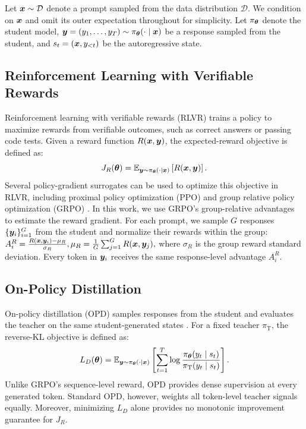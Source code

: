 \documentclass{article} %
\begin{document}
Let \(\bm{x}\sim\mathcal D\) denote a prompt sampled from the data distribution \(\mathcal D\). 
We condition on \(\bm{x}\) and omit its
outer expectation throughout for simplicity. Let \(\pi_{\bm{\theta}}\) denote the student model,
\(\bm{y}=(y_1,\ldots,y_T)\sim\pi_{\bm{\theta}}(\cdot\mid\bm{x})\) be a response sampled
from the student, and \(s_t=(\bm{x},y_{<t})\) be the autoregressive state.

\subsection{Reinforcement Learning with Verifiable Rewards}

Reinforcement learning with verifiable rewards (RLVR) trains a policy to
maximize rewards from verifiable outcomes, such as correct answers or passing
code tests. Given a reward function \(R(\bm{x},\bm{y})\), the expected-reward objective is defined as:
\begin{equation*}
    J_R(\bm{\theta})
    =
    \mathbb E_{\bm{y}\sim\pi_{\bm{\theta}}(\cdot\mid\bm{x})}
    \left[R(\bm{x},\bm{y})\right].
\end{equation*}
Several policy-gradient surrogates can be used to optimize this objective in
RLVR, including proximal policy optimization (PPO)
\citep{schulman2017proximal} and group relative policy optimization (GRPO)
\citep{shao2024deepseekmath}. In this work, we use GRPO's group-relative advantages
to estimate the reward gradient. For each prompt, we sample \(G\) responses
\(\{\bm{y}_i\}_{i=1}^{G}\) from the student and normalize their rewards within
the group:
$A_i^R
    =
    \frac{R(\bm{x},\bm{y}_i)-\mu_R}{\sigma_R},
    \mu_R=\frac{1}{G}\sum_{j=1}^{G}R(\bm{x},\bm{y}_j),$
where \(\sigma_R\) is the group reward standard deviation. Every token in \(\bm{y}_i\) receives
the same response-level advantage \(A_i^R\).

\subsection{On-Policy Distillation}

On-policy distillation (OPD) samples responses from the student and evaluates
the teacher on the same student-generated states
\citep{agarwal2024policy, gu2024minillm}. For a fixed teacher
\(\pi_{\mathrm{T}}\), the reverse-KL objective is defined as:
\begin{equation*}
    L_D(\bm{\theta})
    =
    \mathbb E_{\bm{y}\sim\pi_{\bm{\theta}}(\cdot\mid\bm{x})}
    \left[
        \sum_{t=1}^{T}
        \log
        \frac{\pi_{\bm{\theta}}(y_t\mid s_t)}
             {\pi_{\mathrm{T}}(y_t\mid s_t)}
    \right].
\end{equation*}
Unlike GRPO's sequence-level reward, OPD provides dense supervision at every
generated token. Standard OPD, however, weights all token-level teacher
signals equally. Moreover, minimizing \(L_D\) alone provides no monotonic
improvement guarantee for \(J_R\).
\end{document}
